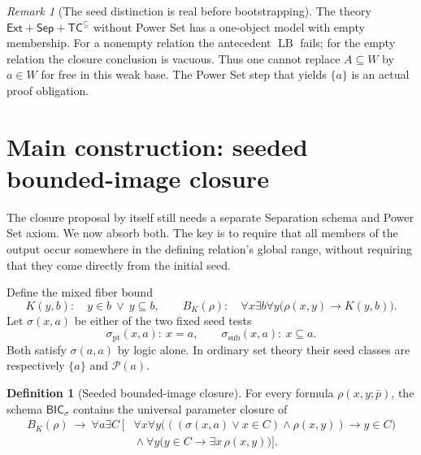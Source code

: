 \documentclass[11pt,letterpaper]{article}
\theoremstyle{definition}\newtheorem{definition}[theorem]{Definition}
\theoremstyle{remark}\newtheorem{remark}[theorem]{Remark}
\newcommand{\Ext}{\mathsf{Ext}}
\newcommand{\Sep}{\mathsf{Sep}}
\newcommand{\Pow}{\mathcal{P}}
\newcommand{\BIC}{\mathsf{BIC}}
\newcommand{\TC}{\mathsf{TC}}
\newcommand{\ps}{\bar p}
\newcommand{\LB}{\operatorname{LB}}
\begin{document}
\begin{remark}[The seed distinction is real before bootstrapping]
The theory $\Ext+\Sep+\TC^{\subseteq}$ without Power Set has a one-object
model with empty membership. For a nonempty relation the antecedent
$\LB$ fails; for the empty relation the closure conclusion is vacuous.
Thus one cannot replace $A\subseteq W$ by $a\in W$ for free in this weak
base. The Power Set step that yields $\{a\}$ is an actual proof obligation.
\end{remark}

\section{Main construction: seeded bounded-image closure}
\label{sec:main}

The closure proposal by itself still needs a separate Separation schema
and Power Set axiom. We now absorb both. The key is to require that all
members of the output occur somewhere in the defining relation's global
range, without requiring that they come directly from the initial seed.

Define the mixed fiber bound
\begin{equation}\label{eq:K}
 K(y,b):\quad y\in b\ \lor\ y\subseteq b,
 \qquad
 B_K(\rho):\quad
 \forall x\exists b\forall y\bigl(\rho(x,y)\to K(y,b)\bigr).
\end{equation}
Let $\sigma(x,a)$ be either of the two fixed seed tests
\begin{equation}\label{eq:seeds}
 \sigma_{\mathrm{pt}}(x,a):\ x=a,
 \qquad
 \sigma_{\mathrm{sub}}(x,a):\ x\subseteq a.
\end{equation}
Both satisfy $\sigma(a,a)$ by logic alone. In ordinary set theory their
seed classes are respectively $\{a\}$ and $\Pow(a)$.

\begin{definition}[Seeded bounded-image closure]\label{def:BIC}
For every formula $\rho(x,y;\ps)$, the schema $\BIC_\sigma$ contains the
universal parameter closure of
\begin{equation}\label{eq:BIC}
\begin{split}
 B_K(\rho)\ \longrightarrow\ \forall a\exists C\,[{}&
 \forall x\forall y\bigl(
   ((\sigma(x,a)\lor x\in C)\land\rho(x,y))\to y\in C\bigr)\\
 &{}\land\forall y\bigl(y\in C\to\exists x\,\rho(x,y)\bigr)].
\end{split}
\end{equation}
\end{definition}
\end{document}
